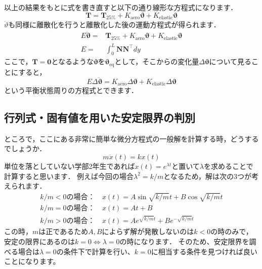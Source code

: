 \documentclass{jarticle}
\begin{document}
以上の結果をもとに式を書き直すと以下の通り線形な方程式になります．
\begin{equation}
    \bm{T} = \bm{T}_\mathrm{25\%} + K_\mathrm{aero} \bm{\vartheta} + K_\mathrm{elastic} \bm{\vartheta}
\end{equation}
$\ddot{\vartheta}$も同様に離散化を行うと離散化した後の運動方程式が得られます．
\begin{align}
    E\ddot{\bm{\vartheta}} =& \bm{T}_\mathrm{25\%} + K_\mathrm{aero} \bm{\vartheta} + K_\mathrm{elastic} \bm{\vartheta} \\
    E =& \int_0^L \bm{N}\bm{N}^\top dy
\end{align}
ここで，$\bm{T}=\bm{0}$となるような$\bm{\vartheta}$を$\bm{\vartheta}_\mathrm{eq}$として，そこからの変化量$\Delta \bm{\vartheta}$について見ることにすると， 
\begin{equation}
    E\Delta\ddot{\bm{\vartheta}} = K_\mathrm{aero} \Delta\bm{\vartheta} + K_\mathrm{elastic} \Delta\bm{\vartheta}
\end{equation}
という平衡状態周りの方程式とできます．

\subsection{行列式・固有値を用いた安定限界の判別}
ところで，ここにある非常に簡単な微分方程式の一般解を計算する時，どうするでしょうか．
\begin{equation}
    m\ddot{x}(t) = kx(t)
\end{equation}
単位を落としていない学部2年生であれば$x(t) = e^{\lambda t}$と置いて$\lambda$を求めることで計算すると思います．
例えば今回の場合$\lambda^2 = k/m$となるため，解は次の3つが考えられます．
\begin{align*}
    k/m < 0の場合：& \ x(t) = A\sin\sqrt{k/m}t + B\cos\sqrt{k/m}t \\
    k/m = 0の場合：& \ x(t) = At + B \\
    k/m > 0の場合：& \ x(t) = Ae^{\sqrt{k/m}t} + Be^{-\sqrt{k/m}t}
\end{align*}
この時，$m$は正であるため$A,B$によらず解が発散しないのは$k < 0$の時のみで，安定の限界にあるのは$k=0 \Leftrightarrow \lambda = 0$の時になります．
そのため、安定限界を調べる場合は$\lambda=0$の条件下で計算を行い、$k=0$に相当する条件を見つければ良いことになります。
\end{document}
